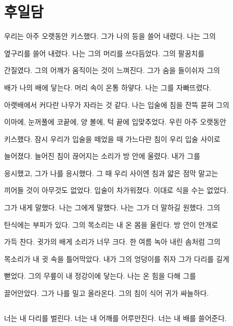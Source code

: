 \hypertarget{uxd6c4uxc77cuxb2f4}{%

\section{후일담}\label{uxd6c4uxc77cuxb2f4}}



우리는 아주 오랫동안 키스했다. 그가 나의 등을 쓸어 내렸다. 나는 그의

옆구리를 쓸어 내렸다. 나는 그의 머리를 쓰다듬었다. 그의 팔꿈치를

간질였다. 그의 어깨가 움직이는 것이 느껴진다. 그가 숨을 들이쉬자 그의

배가 나의 배에 닿는다. 머리 속이 온통 하얗다. 나는 그를 자빠뜨렸다.

아랫배에서 커다란 나무가 자라는 것 같다. 나는 입술에 침을 잔뜩 묻혀 그의

이마에, 눈꺼풀에 코끝에, 양 볼에, 턱 끝에 입맞추었다. 우린 아주 오랫동안

키스했다. 잠시 우리가 입술을 떼었을 때 가느다란 침이 우리 입술 사이로

늘어졌다. 늘어진 침이 끊어지는 소리가 방 안에 울렸다. 내가 그를

응시했고, 그가 나를 응시했다. 그 때 우리 사이엔 침과 얇은 점막 말고는

끼어들 것이 아무것도 없었다. 입술이 차가워졌다. 이대로 식을 수는 없었다.



그가 내게 말했다. 나는 그에게 말했다. 나는 그가 더 말하길 원했다. 그의

탄식에는 부피가 있다. 그의 목소리는 내 온 몸을 울린다. 방 안이 안개로

가득 찬다. 귓가의 배게 소리가 너무 크다. 한 여름 녹아 내린 솜처럼 그의

목소리가 내 귓 속을 틀어막았다. 내가 그의 엉덩이를 쥐자 그가 다리를 길게

뻗었다. 그의 무릎이 내 정강이에 닿는다. 나는 온 힘을 다해 그를

끌어안았다. 그가 나를 밀고 올라온다. 그의 침이 식어 귀가 싸늘하다.



\hypertarget{section}{%

\subsection{}\label{section}}



너는 내 다리를 벌린다. 너는 내 어깨를 어루만진다. 너는 내 배를 쓸어준다.

